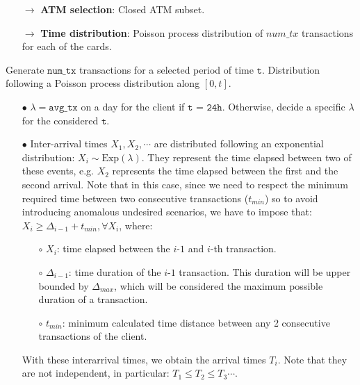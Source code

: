 \documentclass{article}
\begin{document}
\begin{tcolorbox}
  \begin{itemize}
    \item[$\rightarrow$] \textbf{ATM selection}: Closed ATM subset.
    \item[$\rightarrow$] \textbf{Time distribution}: Poisson process distribution of $num\_tx$ 
    transactions for each of the cards.
  \end{itemize}
\end{tcolorbox}


Generate $\texttt{num\_tx}$ transactions for a selected period of time $\texttt{t}$.
Distribution following a Poisson process distribution along $[0,t]$.
\begin{itemize}
    \item[$\bullet$] $\lambda=\texttt{avg\_tx}$ on a day for the client if $\texttt{t = 24h}$. Otherwise, 
    decide a specific $\lambda$ for the considered $\texttt{t}$.
    \item[$\bullet$] Inter-arrival times $X_1, X_2, \cdots$ are distributed following an exponential distribution:
    $X_i \sim \text{Exp}(\lambda)$. They represent the time elapsed between two of these events, e.g. $X_2$ 
    represents the time elapsed between the first and the second arrival. 
    Note that in this case, since we need to respect the minimum required time between two consecutive 
    transactions ($t_{min}$) so to avoid introducing anomalous undesired scenarios, we have to impose 
    that: $X_i \geq \Delta_{i-1} + t_{min}, \forall X_i$, where:

    \begin{itemize}
      \item[$\circ$] $X_{i}$: time elapsed between the $i$-$1$ and $i$-th transaction.
      \item[$\circ$] $\Delta_{i-1}$: time duration of the $i$-$1$ transaction. This duration will 
      be upper bounded by $\Delta_{max}$, which will be considered the maximum possible duration of a transaction.
      \item[$\circ$] $t_{min}$: minimum calculated time distance between any 2 consecutive transactions of the client.
  \end{itemize}

    With these interarrival times, we obtain the arrival times $T_i$. Note that they are not independent, in particular:
    $T_1 \leq T_2 \leq T_3 \cdots$.


\end{itemize}
\end{document}
